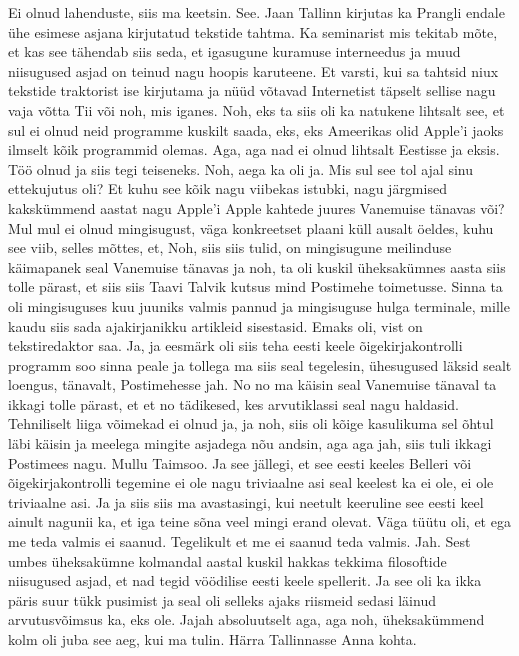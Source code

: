 Ei olnud lahenduste, siis ma keetsin.
See.
Jaan Tallinn kirjutas ka Prangli endale ühe esimese asjana kirjutatud tekstide tahtma.
Ka seminarist mis tekitab mõte, et kas see tähendab siis seda, et igasugune kuramuse interneedus ja muud niisugused asjad on teinud nagu hoopis karuteene. Et varsti, kui sa tahtsid niux tekstide traktorist ise kirjutama ja nüüd võtavad Internetist täpselt sellise nagu vaja võtta Tii või noh, mis iganes.
Noh, eks ta siis oli ka natukene lihtsalt see, et sul ei olnud neid programme kuskilt saada, eks, eks Ameerikas olid Apple'i jaoks ilmselt kõik programmid olemas. Aga, aga nad ei olnud lihtsalt Eestisse ja eksis.
Töö olnud ja siis tegi teiseneks.
Noh, aega ka oli ja.
Mis sul see tol ajal sinu ettekujutus oli? Et kuhu see kõik nagu viibekas istubki, nagu järgmised kakskümmend aastat nagu Apple'i Apple kahtede juures Vanemuise tänavas või?
Mul mul ei olnud mingisugust, väga konkreetset plaani küll ausalt öeldes, kuhu see viib, selles mõttes, et,
Noh, siis siis tulid, on mingisugune meilinduse käimapanek seal Vanemuise tänavas ja noh, ta oli kuskil üheksakümnes aasta siis tolle pärast, et siis siis Taavi Talvik kutsus mind Postimehe toimetusse.
Sinna ta oli mingisuguses kuu juuniks valmis pannud ja mingisuguse hulga terminale, mille kaudu siis sada ajakirjanikku artikleid sisestasid. Emaks oli, vist on tekstiredaktor saa. Ja, ja eesmärk oli siis teha eesti keele õigekirjakontrolli programm soo sinna peale ja tollega ma siis seal tegelesin, ühesugused läksid sealt loengus, tänavalt, Postimehesse jah. No no ma käisin seal Vanemuise tänaval ta ikkagi tolle pärast, et et no tädikesed, kes arvutiklassi seal nagu haldasid. Tehniliselt liiga võimekad ei olnud ja, ja noh, siis oli kõige kasulikuma sel õhtul läbi käisin ja meelega mingite asjadega nõu andsin, aga aga jah, siis tuli ikkagi Postimees nagu.
Mullu Taimsoo.
Ja see jällegi, et see eesti keeles Belleri või õigekirjakontrolli tegemine ei ole nagu triviaalne asi seal keelest ka ei ole, ei ole triviaalne asi.
Ja ja siis siis ma avastasingi, kui neetult keeruline see eesti keel ainult nagunii ka, et iga teine sõna veel mingi erand olevat. Väga tüütu oli, et ega me teda valmis ei saanud.
Tegelikult et me ei saanud teda valmis. Jah.
Sest umbes üheksakümne kolmandal aastal kuskil hakkas tekkima filosoftide niisugused asjad, et nad tegid vöödilise eesti keele spellerit. Ja see oli ka ikka päris suur tükk pusimist ja seal oli selleks ajaks riismeid sedasi läinud arvutusvõimsus ka, eks ole.
Jajah absoluutselt aga, aga noh, üheksakümmend kolm oli juba see aeg, kui ma tulin.
Härra Tallinnasse Anna kohta.
